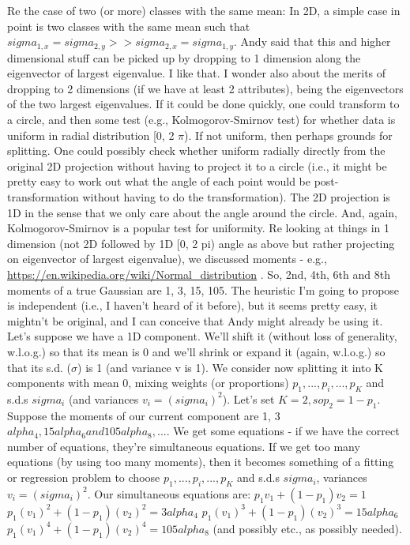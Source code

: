 \documentclass{elsarticle}
\begin{document}
Re the case of two (or more) classes with the same mean:
In 2D, a simple case in point is two classes with the same mean
such that $sigma_{1, x} = sigma_{2, y} >> sigma_{2, x} = sigma_{1, y}$.
Andy said that this and higher dimensional stuff can be picked up
by dropping to 1 dimension along the eigenvector of largest eigenvalue.
I like that.
I wonder also about the merits of dropping to 2 dimensions (if we have
at least 2 attributes), being the eigenvectors of the two largest eigenvalues.
If it could be done quickly, one could transform to a circle, and then
some test (e.g., Kolmogorov-Smirnov test) for whether data is uniform
in radial distribution [0, 2 $\pi$).  If not uniform, then perhaps grounds for
splitting.
One could possibly check whether uniform radially directly from the
original 2D projection without having to project it to a circle (i.e., it
might be pretty easy to work out what the angle of each point would
be post-transformation without having to do the transformation).  The
2D projection is 1D in the sense that we only care about the angle
around the circle.  And, again, Kolmogorov-Smirnov is a popular test
for uniformity.
Re looking at things in 1 dimension (not 2D followed by 1D [0, 2 pi) angle
as above but rather projecting on eigenvector of largest eigenvalue), we
discussed moments - e.g., \url{https://en.wikipedia.org/wiki/Normal_distribution} .
So, 2nd, 4th, 6th and 8th moments of a true Gaussian are 1, 3, 15, 105.
The heuristic I'm going to propose is independent (i.e., I haven't heard
of it before), but it seems pretty easy, it mightn't be original, and I can
conceive that Andy might already be using it.
Let's suppose we have a 1D component.  We'll shift it (without loss of
generality, w.l.o.g.) so that its mean is 0 and we'll shrink or expand it
(again, w.l.o.g.) so that its s.d. ($\sigma$) is 1 (and variance v is 1).
We consider now splitting it into K components with mean 0,
mixing weights (or proportions) $p_1, ..., p_i, ..., p_K$ and s.d.s $sigma_i$ (and variances $v_i = (sigma_i)^2$).
Let's set $K = 2, so p_2 = 1 - p_1$.
Suppose the moments of our current component are 1, 3 $alpha_4, 15 alpha_6 and 105 alpha_8, ... $.
We get some equations - if we have the correct number of equations,
they're simultaneous equations.
If we get too many equations (by using too many moments), then it
becomes something of a fitting or regression problem to choose
$p_1, ..., p_i, ..., p_K$ and s.d.s $sigma_i$, variances $v_i = (sigma_i)^2$.
Our simultaneous equations are:
$p_1 v_1       + (1 - p_1) v_2       =    1$
$p_1 (v_1)^2  + (1 - p_1) (v_2)^2  =    3 alpha_4$
$p_1 (v_1)^3  + (1 - p_1) (v_2)^3  =   15 alpha_6$
$p_1 (v_1)^4  + (1 - p_1) (v_2)^4  =  105 alpha_8$
(and possibly etc., as possibly needed).
\end{document}
